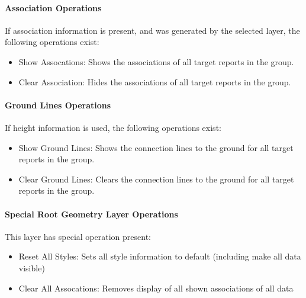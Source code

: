 \paragraph{Association Operations}
If association information is present, and was generated by the selected layer, the following operations exist:

\begin{itemize}
 \item Show Assocations: Shows the associations of all target reports in the group.
 \item Clear Association: Hides the associations of all target reports in the group.
\end{itemize} 


\paragraph{Ground Lines Operations}
If height information is used, the following operations exist:

\begin{itemize}
 \item Show Ground Lines: Shows the connection lines to the ground for all target reports in the group.
 \item Clear Ground Lines: Clears the connection lines to the ground for all target reports in the group.
\end{itemize} 


\paragraph{Special Root Geometry Layer Operations}
This layer has special operation present:

\begin{itemize}
 \item Reset All Styles: Sets all style information to default (including make all data visible)
 \item Clear All Assocations: Removes display of all shown associations of all data
\end{itemize} 
